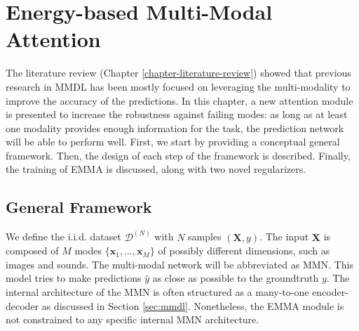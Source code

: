 \chapter{Energy-based Multi-Modal Attention} 
\label{chapter-emma} 

The literature review (Chapter \ref{chapter-literature-review}) showed that previous research in MMDL has been mostly focused on leveraging the multi-modality to improve the accuracy of the predictions. In this chapter, a new attention module is presented to increase the robustness against failing modes: as long as at least one modality provides enough information for the task, the prediction network will be able to perform well. First, we start by providing a conceptual general framework. Then, the design of each step of the framework is described. Finally, the training of EMMA is discussed, along with two novel regularizers. 


\section{General Framework}\label{sec:general-framework}

We define the i.i.d. dataset $\mathcal{D}^{(N)}$ with $N$ samples  $(\mathbf{X},y)$. The input $\textbf{X}$ is composed of $M$ modes $\{\mathbf{x}_1, \ldots, \mathbf{x}_M\}$ of possibly different dimensions, such as images and sounds. The multi-modal network will be abbreviated as MMN. This model tries to make predictions $\hat{y}$ as close as possible to the groundtruth $y$. The internal architecture of the MMN is often structured as a many-to-one encoder-decoder as discussed in Section \ref{sec:mmdl}. Nonetheless, the EMMA module is not constrained to any specific internal MMN architecture.

